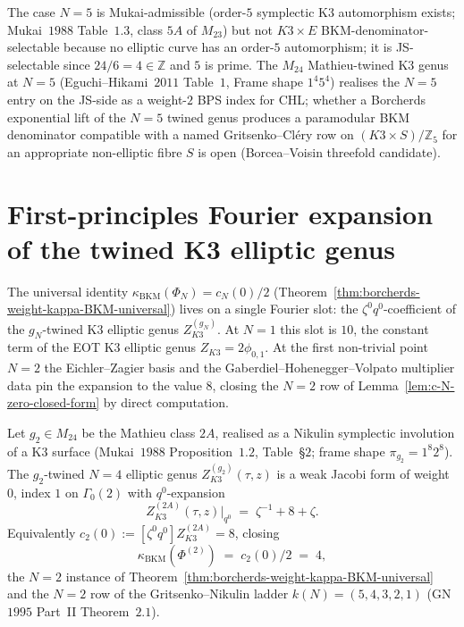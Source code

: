 \begin{remark}[Open case \texorpdfstring{$N = 5$}{N = 5}]
\label{rem:k3e-n-equal-5-open}
The case $N = 5$ is Mukai-admissible (order-$5$ symplectic K3 automorphism exists; Mukai~$1988$ Table~$1.3$, class $5A$ of $M_{23}$) but not $K3\times E$ BKM-denominator-selectable because no elliptic curve has an order-$5$ automorphism; it is JS-selectable since $24/6 = 4 \in \mathbb{Z}$ and $5$ is prime. The $M_{24}$ Mathieu-twined K3 genus at $N = 5$ (Eguchi--Hikami~$2011$ Table~$1$, Frame shape $1^4 5^4$) realises the $N = 5$ entry on the JS-side as a weight-$2$ BPS index for CHL; whether a Borcherds exponential lift of the $N = 5$ twined genus produces a paramodular BKM denominator compatible with a named Gritsenko--Cl\'ery row on $(K3 \times S)/\mathbb{Z}_5$ for an appropriate non-elliptic fibre $S$ is open (Borcea--Voisin threefold candidate).
\end{remark}

\section{First-principles Fourier expansion of the twined K3 elliptic genus}
\label{sec:k3e-c2-direct-Fourier}

The universal identity $\kappa_{\mathrm{BKM}}(\Phi_N) = c_N(0)/2$
(Theorem~\ref{thm:borcherds-weight-kappa-BKM-universal}) lives on a
single Fourier slot: the $\zeta^0 q^0$-coefficient of the
$g_N$-twined K3 elliptic genus $Z^{(g_N)}_{K3}$. At
$N = 1$ this slot is $10$, the constant term of the EOT K3 elliptic genus
$Z_{K3} = 2\phi_{0, 1}$. At the first non-trivial point $N = 2$
the Eichler--Zagier basis and the Gaberdiel--Hohenegger--Volpato
multiplier data pin the expansion to the value $8$, closing the
$N = 2$ row of Lemma~\ref{lem:c-N-zero-closed-form} by direct
computation.

\begin{theorem}
\label{thm:k3e-c2-direct-Fourier}
Let $g_2 \in M_{24}$ be the Mathieu class $2A$, realised as a Nikulin
symplectic involution of a K3 surface (Mukai~$1988$
Proposition~$1.2$, Table~\S$2$; frame shape $\pi_{g_2} = 1^8 2^8$).
The $g_2$-twined $N{=}4$ elliptic genus $Z^{(g_2)}_{K3}(\tau, z)$ is a
weak Jacobi form of weight $0$, index $1$ on $\Gamma_0(2)$ with
$q^0$-expansion
\[
Z^{(2A)}_{K3}(\tau, z)\big|_{q^0} \;=\; \zeta^{-1} + 8 + \zeta.
\]
Equivalently $c_2(0) := [\zeta^0 q^0] Z^{(2A)}_{K3} = 8$, closing
\[
\kappa_{\mathrm{BKM}}(\Phi^{(2)}) \;=\; c_2(0)/2 \;=\; 4,
\]
the $N = 2$ instance of
Theorem~\ref{thm:borcherds-weight-kappa-BKM-universal} and the
$N = 2$ row of the Gritsenko--Nikulin ladder
$k(N) = (5, 4, 3, 2, 1)$ (GN~$1995$ Part~II Theorem~$2.1$).
\end{theorem}

